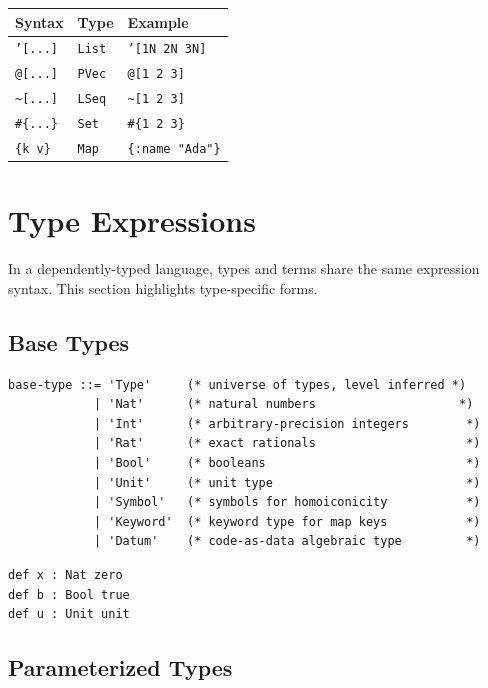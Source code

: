 \documentclass[11pt]{article}
\begin{document}
\begin{center}
\begin{tabular}{lll}
Syntax & Type & Example\\
\hline
\texttt{'[...]} & \texttt{List} & \texttt{'[1N 2N 3N]}\\
\texttt{@[...]} & \texttt{PVec} & \texttt{@[1 2 3]}\\
\texttt{\textasciitilde{}[...]} & \texttt{LSeq} & \texttt{\textasciitilde{}[1 2 3]}\\
\texttt{\#\{...\}} & \texttt{Set} & \texttt{\#\{1 2 3\}}\\
\texttt{\{k v\}} & \texttt{Map} & \texttt{\{:name "Ada"\}}\\
\end{tabular}
\end{center}
\section{Type Expressions}
\label{sec:orgeb03ab5}

In a dependently-typed language, types and terms share the same expression
syntax. This section highlights type-specific forms.
\subsection{Base Types}
\label{sec:org1a9b3ef}

\begin{verbatim}
base-type ::= 'Type'     (* universe of types, level inferred *)
            | 'Nat'      (* natural numbers                    *)
            | 'Int'      (* arbitrary-precision integers        *)
            | 'Rat'      (* exact rationals                     *)
            | 'Bool'     (* booleans                            *)
            | 'Unit'     (* unit type                           *)
            | 'Symbol'   (* symbols for homoiconicity           *)
            | 'Keyword'  (* keyword type for map keys           *)
            | 'Datum'    (* code-as-data algebraic type         *)
\end{verbatim}

\begin{verbatim}
def x : Nat zero
def b : Bool true
def u : Unit unit
\end{verbatim}
\subsection{Parameterized Types}
\label{sec:orgcebf12b}
\end{document}
